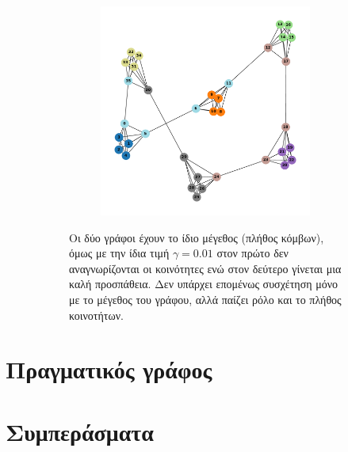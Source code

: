 \documentclass[12pt, letterpaper]{article}
\begin{document}
\begin{figure}
\begin{subfigure}{0.66\linewidth}
\begin{subfigure}{0.45\linewidth}
        \label{}
    \end{subfigure}
    \begin{subfigure}{0.45\linewidth}
        \centering
        \includegraphics[width=\linewidth]{nonconnected_ssize_dcs0.012.pdf}
        \label{}
    \end{subfigure}
    \caption{Οι δύο γράφοι έχουν το ίδιο μέγεθος (πλήθος κόμβων), όμως με την ίδια τιμή 
    $\gamma = 0.01$ στον πρώτο δεν αναγνωρίζονται οι κοινότητες ενώ στον δεύτερο γίνεται 
    μια καλή προσπάθεια. Δεν υπάρχει επομένως συσχέτηση μόνο με το μέγεθος του γράφου, 
    αλλά παίζει ρόλο και το πλήθος κοινοτήτων.}
    \label{ss_dcs}
  \end{subfigure}
  \caption{}
  \label{endplots}
\end{figure}



\section{Πραγματικός γράφος}







\section{Συμπεράσματα}
\end{document}
